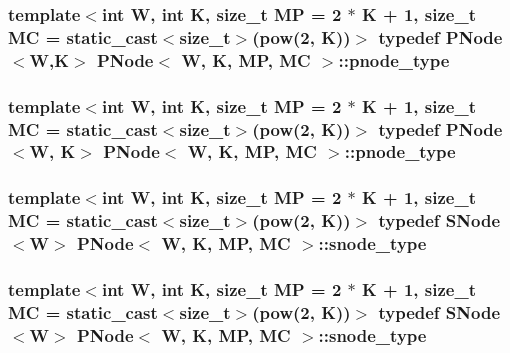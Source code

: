\hypertarget{structPNode_a9f0e0153a9ff0faff3baa323c601f03a}{
\subsubsection[{pnode\-\_\-type}]{\setlength{\rightskip}{0pt plus 5cm}template$<$int W, int K, size\-\_\-t M\-P = 2 $\ast$ K + 1, size\-\_\-t M\-C = static\-\_\-cast$<$size\-\_\-t$>$(pow(2, K))$>$ typedef {\bf P\-Node}$<${\bf W},K$>$ {\bf P\-Node}$<$ {\bf W}, K, M\-P, M\-C $>$\-::{\bf pnode\-\_\-type}}}\label{structPNode_a9f0e0153a9ff0faff3baa323c601f03a}
\hypertarget{structPNode_a1b352e46062624fb69f76221f4e183e7}{
\subsubsection[{pnode\-\_\-type}]{\setlength{\rightskip}{0pt plus 5cm}template$<$int W, int K, size\-\_\-t M\-P = 2 $\ast$ K + 1, size\-\_\-t M\-C = static\-\_\-cast$<$size\-\_\-t$>$(pow(2, K))$>$ typedef {\bf P\-Node}$<${\bf W}, K$>$ {\bf P\-Node}$<$ {\bf W}, K, M\-P, M\-C $>$\-::{\bf pnode\-\_\-type}}}\label{structPNode_a1b352e46062624fb69f76221f4e183e7}
\hypertarget{structPNode_a7d5f0e3af582a8c9f59a479f99a6ac09}{
\subsubsection[{snode\-\_\-type}]{\setlength{\rightskip}{0pt plus 5cm}template$<$int W, int K, size\-\_\-t M\-P = 2 $\ast$ K + 1, size\-\_\-t M\-C = static\-\_\-cast$<$size\-\_\-t$>$(pow(2, K))$>$ typedef {\bf S\-Node}$<${\bf W}$>$ {\bf P\-Node}$<$ {\bf W}, K, M\-P, M\-C $>$\-::{\bf snode\-\_\-type}}}\label{structPNode_a7d5f0e3af582a8c9f59a479f99a6ac09}
\hypertarget{structPNode_a7d5f0e3af582a8c9f59a479f99a6ac09}{
\subsubsection[{snode\-\_\-type}]{\setlength{\rightskip}{0pt plus 5cm}template$<$int W, int K, size\-\_\-t M\-P = 2 $\ast$ K + 1, size\-\_\-t M\-C = static\-\_\-cast$<$size\-\_\-t$>$(pow(2, K))$>$ typedef {\bf S\-Node}$<${\bf W}$>$ {\bf P\-Node}$<$ {\bf W}, K, M\-P, M\-C $>$\-::{\bf snode\-\_\-type}}}\label{structPNode_a7d5f0e3af582a8c9f59a479f99a6ac09}


